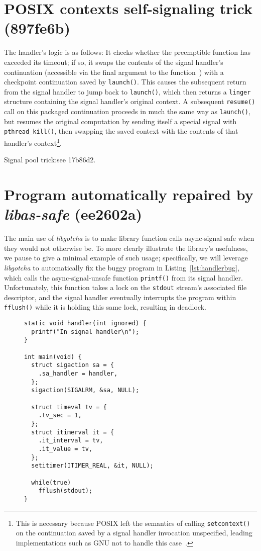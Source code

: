 \documentclass[12pt,letterpaper]{book}
\begin{document}
\section{POSIX contexts self-signaling trick (897fe6b)}

The handler's logic is as follows:  It checks whether
the preemptible function has exceeded its timeout; if so, it swaps the contents
of the signal handler's continuation (accessible via the final argument to the
function~\cite{sigaction-manpage}) with a checkpoint continuation saved by
\texttt{launch()}.  This causes the subsequent return from the signal handler
to jump back to \texttt{launch()}, which then returns a \texttt{linger}
structure containing the signal handler's original context.  A subsequent
\texttt{resume()} call on this packaged continuation proceeds in much the same
way as \texttt{launch()}, but resumes the original computation by sending
itself a special signal with \texttt{pthread\_kill()}, then swapping the saved
context with the contents of that handler's context\footnote{This is necessary
because POSIX left the semantics of calling \texttt{setcontext()} on the
continuation saved by a signal handler invocation unspecified, leading
implementations such as GNU not to handle this
case~\cite{getcontext-manpage}.}.

Signal pool trick:\@ see 17b86d2.


\section{Program automatically repaired by \textit{libas-safe} (ee2602a)}

The main use of \textit{libgotcha} is to make library function calls async-signal safe when
they would not otherwise be.  To more clearly illustrate the library's usefulness, we
pause to give a minimal example of such usage; specifically, we will leverage
\textit{libgotcha} to automatically fix the buggy program in Listing~\ref{lst:handlerbug},
which calls the async-signal-unsafe function \texttt{printf()} from its signal
handler.  Unfortunately, this function takes a lock on the \texttt{stdout} stream's
associated file descriptor, and the signal handler eventually interrupts the program
within \texttt{fflush()} while it is holding this same lock, resulting in deadlock.

\begin{figure}
\begin{lstlisting}[label=lst:handlerbug,caption=C program with a buggy signal handler]
static void handler(int ignored) {
  printf("In signal handler\n");
}

int main(void) {
  struct sigaction sa = {
    .sa_handler = handler,
  };
  sigaction(SIGALRM, &sa, NULL);

  struct timeval tv = {
    .tv_sec = 1,
  };
  struct itimerval it = {
    .it_interval = tv,
    .it_value = tv,
  };
  setitimer(ITIMER_REAL, &it, NULL);

  while(true)
    fflush(stdout);
}
\end{lstlisting}
\end{figure}
\end{document}
